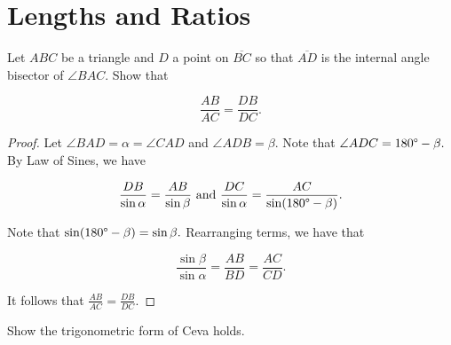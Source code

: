\documentclass[letterpaper,oneside]{scrartcl}
\begin{document}
\section{Lengths and Ratios}
\begin{theorem*}
     Let $ABC$ be a triangle and $D$ a point on $\overline{BC}$ so that $\overline{AD}$ is the internal angle bisector of $\angle BAC.$ Show that

  $$\frac{AB}{AC} = \frac{DB}{DC}.$$
\end{theorem*}

\begin{proof}  Let $\angle BAD = \alpha = \angle CAD$ and $\angle ADB = \beta.$ Note that $\angle ADC = 180\degree - \beta.$ By Law of Sines, we have

  $$\frac{DB}{\sin\alpha} = \frac{AB}{\sin\beta} \text{  and  } \frac{DC}{\sin\alpha} = \frac{AC}{\sin(180\degree - \beta)}.$$

  Note that $\sin(180\degree-\beta) = \sin\beta.$ Rearranging terms, we have that

  $$\frac{\sin\beta}{\sin\alpha} = \frac{AB}{BD} = \frac{AC}{CD}.$$

  It follows that $\frac{AB}{AC} = \frac{DB}{DC}.$
\end{proof}

\begin{problem*}
  [3.5]
  Show the trigonometric form of Ceva holds.
\end{problem*}
\end{document}
